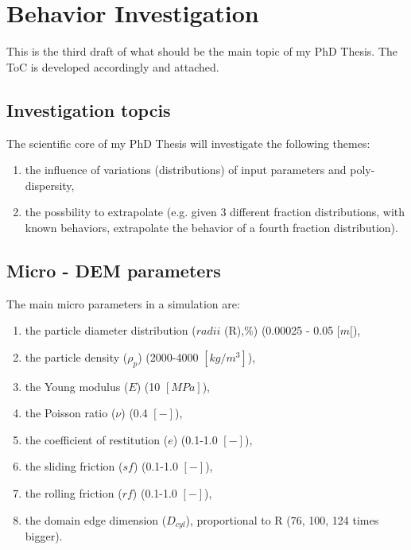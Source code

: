 
\section{Behavior Investigation}
\label{section:behaviorinvestigation}

This is the third draft of what should be the main topic of my PhD Thesis. The ToC is developed accordingly and attached.

\subsection{Investigation topcis}
\label{subsection:investigationtopics}

The scientific core of my PhD Thesis will investigate the following themes:
\begin{enumerate}
\item{the influence of variations (distributions) of input parameters and poly-dispersity,}
\item{the possbility to extrapolate (e.g. given 3 different fraction distributions, with known behaviors, extrapolate the behavior of a fourth fraction distribution).}
\end{enumerate}


\subsection{Micro - DEM parameters}
\label{subsection:microparameters}

The main micro parameters in a simulation are:

\begin{enumerate}[label=(\Alph*)]
\item{the particle diameter distribution ($radii$ (R),\%) (0.00025 - 0.05 $[m[$),}
\item{the particle density ($\rho_p$) (2000-4000 $[kg/m^3]$),}
\item{the Young modulus ($E$) (10 $[MPa]$),}
\item{the Poisson ratio ($\nu$) (0.4 $[-]$),}
\item{the coefficient of restitution ($e$) (0.1-1.0 $[-]$),}
\item{the sliding friction ($sf$) (0.1-1.0 $[-]$),}
\item{the rolling friction ($rf$) (0.1-1.0 $[-]$),}
\item{the domain edge dimension ($D_{cyl}$), proportional to R (76, 100, 124 times bigger).}
\end{enumerate}

